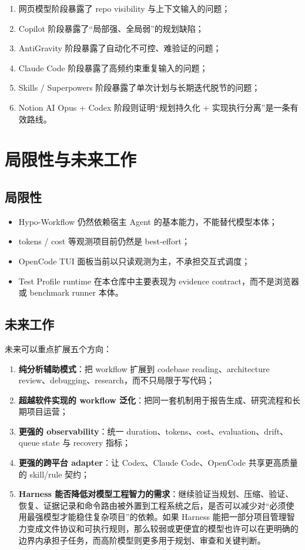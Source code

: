 \documentclass[
  outputdir=build,
  chapterstyle=cn,
  colorscheme=Simple,
  fontset=tech,
  code=false
]{Hypo-Note}
\begin{document}
\begin{enumerate}[leftmargin=2em]
  \item 网页模型阶段暴露了 repo visibility 与上下文输入的问题；
  \item Copilot 阶段暴露了“局部强、全局弱”的规划缺陷；
  \item AntiGravity 阶段暴露了自动化不可控、难验证的问题；
  \item Claude Code 阶段暴露了高频约束重复输入的问题；
  \item Skills / Superpowers 阶段暴露了单次计划与长期迭代脱节的问题；
  \item Notion AI Opus + Codex 阶段则证明“规划持久化 + 实现执行分离”是一条有效路线。
\end{enumerate}

\chapter{局限性与未来工作}

\section{局限性}

\begin{itemize}[leftmargin=2em]
  \item Hypo-Workflow 仍然依赖宿主 Agent 的基本能力，不能替代模型本体；
  \item tokens / cost 等观测项目前仍然是 best-effort；
  \item OpenCode TUI 面板当前以只读观测为主，不承担交互式调度；
  \item Test Profile runtime 在本仓库中主要表现为 evidence contract，而不是浏览器或 benchmark runner 本体。
\end{itemize}

\section{未来工作}

未来可以重点扩展五个方向：

\begin{enumerate}[leftmargin=2em]
  \item \textbf{纯分析辅助模式}：把 workflow 扩展到 codebase reading、architecture review、debugging、research，而不只局限于写代码；
  \item \textbf{超越软件实现的 workflow 泛化}：把同一套机制用于报告生成、研究流程和长期项目运营；
  \item \textbf{更强的 observability}：统一 duration、tokens、cost、evaluation、drift、queue state 与 recovery 指标；
  \item \textbf{更强的跨平台 adapter}：让 Codex、Claude Code、OpenCode 共享更高质量的 skill/rule 契约；
  \item \textbf{Harness 能否降低对模型工程智力的需求}：继续验证当规划、压缩、验证、恢复、证据记录和命令路由被外置到工程系统之后，是否可以减少对“必须使用最强模型才能稳住复杂项目”的依赖。如果 Harness 能把一部分项目管理智力变成文件协议和可执行规则，那么较弱或更便宜的模型也许可以在更明确的边界内承担子任务，而高阶模型则更多用于规划、审查和关键判断。
\end{enumerate}
\end{document}
